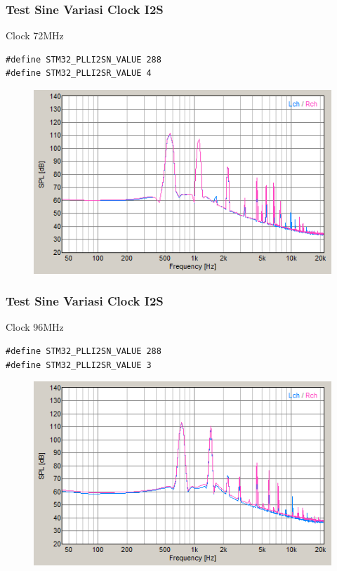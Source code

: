 \documentclass[table,dvipsnames,10pt]{beamer}
\begin{document}
	\begin{frame}[fragile]
	\frametitle{Test Sine Variasi Clock I2S}
	\begin{exampleblock}{Clock 72MHz}
		\begin{verbatim}
#define STM32_PLLI2SN_VALUE 288
#define STM32_PLLI2SR_VALUE 4
		\end{verbatim}
	\end{exampleblock}
	\begin{exampleblock}{}
		\begin{figure}[H]
			\centering
			\includegraphics[width=0.5\linewidth]{result/day_2/sine_clk72}
		\end{figure}
	\end{exampleblock}
	\end{frame}

	\begin{frame}[fragile]
	\frametitle{Test Sine Variasi Clock I2S}
	\begin{exampleblock}{Clock 96MHz}
		\begin{verbatim}
#define STM32_PLLI2SN_VALUE 288
#define STM32_PLLI2SR_VALUE 3
		\end{verbatim}
	\end{exampleblock}
	\begin{exampleblock}{}
		\begin{figure}[H]
			\centering
			\includegraphics[width=0.5\linewidth]{result/day_2/sine_clk96}
		\end{figure}
	\end{exampleblock}
	\end{frame}
\end{document}

